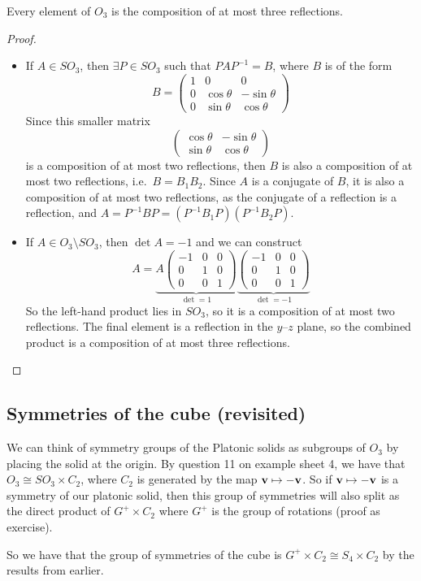 \begin{corollary}
	Every element of \(O_3\) is the composition of at most three reflections.
\end{corollary}
\begin{proof}
	\begin{itemize}
		\item If \(A \in SO_3\), then \(\exists P \in SO_3\) such that \(PAP^{-1} = B\), where \(B\) is of the form
		      \[
			      B = \begin{pmatrix}
				      1 & 0           & 0            \\
				      0 & \cos \theta & -\sin \theta \\
				      0 & \sin \theta & \cos \theta
			      \end{pmatrix}
		      \]
		      Since this smaller matrix
		      \[
			      \begin{pmatrix}
				      \cos \theta & -\sin \theta \\
				      \sin \theta & \cos \theta
			      \end{pmatrix}
		      \]
		      is a composition of at most two reflections, then \(B\) is also a composition of at most two reflections, i.e.\ \(B = B_1 B_2\).
		      Since \(A\) is a conjugate of \(B\), it is also a composition of at most two reflections, as the conjugate of a reflection is a reflection, and \(A = P^{-1}BP = (P^{-1}B_1P)(P^{-1}B_2P)\).
		\item If \(A \in O_3 \setminus SO_3\), then \(\det A = -1\) and we can construct
		      \[
			      A = \underbrace{A\begin{pmatrix}
					      -1 & 0 & 0 \\
					      0  & 1 & 0 \\
					      0  & 0 & 1
				      \end{pmatrix}}_{\det = 1}\underbrace{\begin{pmatrix}
					      -1 & 0 & 0 \\
					      0  & 1 & 0 \\
					      0  & 0 & 1
				      \end{pmatrix}}_{\det = -1}
		      \]
		      So the left-hand product lies in \(SO_3\), so it is a composition of at most two reflections.
		      The final element is a reflection in the \(y\)--\(z\) plane, so the combined product is a composition of at most three reflections.
	\end{itemize}
\end{proof}

\subsection{Symmetries of the cube (revisited)}
We can think of symmetry groups of the Platonic solids as subgroups of \(O_3\) by placing the solid at the origin.
By question 11 on example sheet 4, we have that \(O_3 \cong SO_3 \times C_2\), where \(C_2\) is generated by the map \(\vb v \mapsto -\vb v\).
So if \(\vb v\mapsto -\vb v\) is a symmetry of our platonic solid, then this group of symmetries will also split as the direct product of \(G^+ \times C_2\) where \(G^+\) is the group of rotations (proof as exercise).

So we have that the group of symmetries of the cube is \(G^+ \times C_2 \cong S_4 \times C_2\) by the results from earlier.
